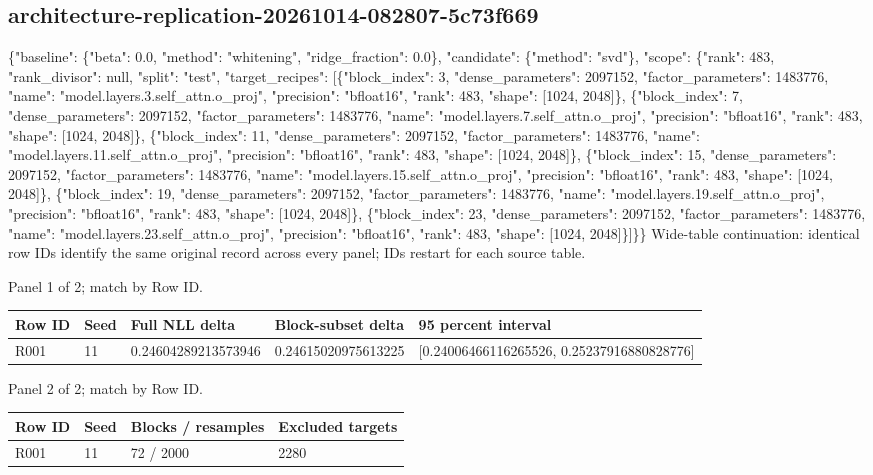 \documentclass[10pt]{article}
\begin{document}
\subsection{architecture-replication-20261014-082807-5c73f669}
\{"baseline": \{"beta": 0.0, "method": "whitening", "ridge\_fraction": 0.0\}, "candidate": \{"method": "svd"\}, "scope": \{"rank": 483, "rank\_divisor": null, "split": "test", "target\_recipes": [\{"block\_index": 3, "dense\_parameters": 2097152, "factor\_parameters": 1483776, "name": "model.layers.3.self\_attn.o\_proj", "precision": "bfloat16", "rank": 483, "shape": [1024, 2048]\}, \{"block\_index": 7, "dense\_parameters": 2097152, "factor\_parameters": 1483776, "name": "model.layers.7.self\_attn.o\_proj", "precision": "bfloat16", "rank": 483, "shape": [1024, 2048]\}, \{"block\_index": 11, "dense\_parameters": 2097152, "factor\_parameters": 1483776, "name": "model.layers.11.self\_attn.o\_proj", "precision": "bfloat16", "rank": 483, "shape": [1024, 2048]\}, \{"block\_index": 15, "dense\_parameters": 2097152, "factor\_parameters": 1483776, "name": "model.layers.15.self\_attn.o\_proj", "precision": "bfloat16", "rank": 483, "shape": [1024, 2048]\}, \{"block\_index": 19, "dense\_parameters": 2097152, "factor\_parameters": 1483776, "name": "model.layers.19.self\_attn.o\_proj", "precision": "bfloat16", "rank": 483, "shape": [1024, 2048]\}, \{"block\_index": 23, "dense\_parameters": 2097152, "factor\_parameters": 1483776, "name": "model.layers.23.self\_attn.o\_proj", "precision": "bfloat16", "rank": 483, "shape": [1024, 2048]\}]\}\}
Wide-table continuation: identical row IDs identify the same original record across every panel; IDs restart for each source table.
\par\noindent Panel 1 of 2; match by Row ID.
{\scriptsize\setlength{\tabcolsep}{2pt}
\begin{longtable}{p{}p{}p{}p{}p{}}
Row ID & Seed & Full NLL delta & Block-subset delta & 95 percent interval \\
\hline\endhead
R001 & 11 & 0.24604289213573946 & 0.24615020975613225 & [0.24006466116265526, 0.25237916880828776] \\
\end{longtable}}
\par\noindent Panel 2 of 2; match by Row ID.
{\scriptsize\setlength{\tabcolsep}{2pt}
\begin{longtable}{p{}p{}p{}p{}}
Row ID & Seed & Blocks / resamples & Excluded targets \\
\hline\endhead
R001 & 11 & 72 / 2000 & 2280 \\
\end{longtable}}
\end{document}
